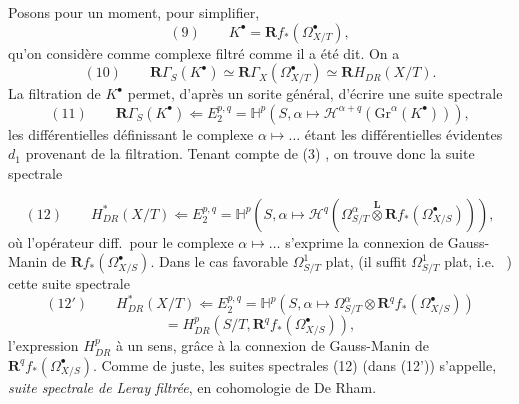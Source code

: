 \documentclass[11pt,a4paper]{article}
\begin{document}
Posons pour un moment, pour simplifier,
\[
(9) \qquad K^{\bullet} = \mathbf{R}f_{*}(\Omega^{\bullet}_{X/T}) ,
\]
qu'on considère  comme complexe filtré comme il a été dit. On a 
\[
(10) \qquad \mathbf{R}\Gamma_{S}(K^{\bullet}) \simeq \mathbf{R}\Gamma_{X}(\Omega^{\bullet}_{X/T}) \simeq \mathbf{R}H_{DR}(X/T) .
\]
La filtration de $K^{\bullet}$ permet, d'après un sorite général, d'écrire une suite spectrale
\[
(11) \qquad \mathbf{R}\Gamma_{S}(K^{\bullet}) \Longleftarrow E^{p,q}_{2} = \mathbb{H}^{p}(S, \alpha \mapsto \mathcal{H}^{\alpha+q}(\mathrm{Gr}^{\alpha}(K^{\bullet}))) ,
\]
les différentielles définissant le complexe $\alpha \mapsto \ldots$ étant les différentielles évidentes $d_{1}$ provenant de la filtration. Tenant compte de (3) , on trouve donc la suite spectrale

\[
(12) \qquad H^{*}_{DR}(X/T) \Longleftarrow E^{p,q}_{2} = \mathbb{H}^{p}(S, \alpha \mapsto \mathcal{H}^{q}(\Omega^{\alpha}_{S/T} \overset{\mathbf{L}}{\otimes} \mathbf{R}f_{*}(\Omega^{\bullet}_{X/S}))) ,
\]
où l'opérateur diff.\ pour le complexe $\alpha \mapsto \ldots$ s'exprime      la connexion de Gauss-Manin de $\mathbf{R}f_{*}(\Omega^{\bullet}_{X/S})$. Dans le cas favorable $\Omega^{1}_{S/T}$ plat, (il suffit $\Omega^{1}_{S/T}$ plat, i.e.\  ) \struck{\ill{}} cette suite spectrale 
\[
(12') \qquad H^{*}_{DR}(X/T) \Longleftarrow E^{p,q}_{2} = \mathbb{H}^{p}(S, \alpha \mapsto \Omega^{\alpha}_{S/T} \otimes \mathbf{R}^{q}f_{*}(\Omega^{\bullet}_{X/S}))
\]
\[
= H^{p}_{DR}(S/T, \mathbf{R}^{q}f_{*}(\Omega^{\bullet}_{X/S})) ,
\]
l'expression $H^{p}_{DR}$ à   un sens, grâce à la connexion de Gauss-Manin de $\mathbf{R}^{q}f_{*}(\Omega^{\bullet}_{X/S})$.
Comme de juste, les suites spectrales (12)  (dans (12')) s'appelle, \struck{\ill{}} \emph{suite spectrale de Leray filtrée}, en cohomologie de De Rham.
\end{document}
